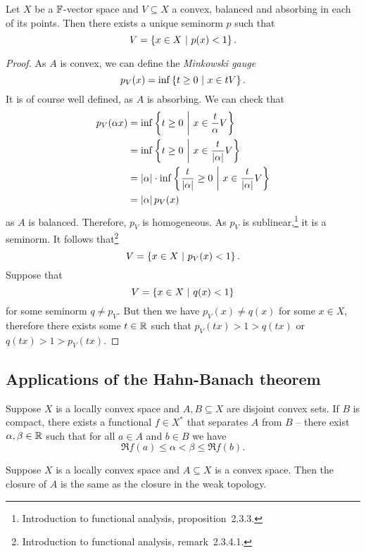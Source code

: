 \begin{izrek}
Let $X$ be a $\mathbb{F}$-vector space and $V \subseteq X$ a convex,
balanced and absorbing in each of its points. Then there exists a
unique seminorm $p$ such that
\[
V = \left\{x \in X~\middle\vert~p(x) < 1\right\}.
\]
\end{izrek}

\begin{proof}
As $A$ is convex, we can define the
\emph{Minkowski gauge}
\[
p_V(x) = \inf \left\{t \geq 0~\middle\vert~x \in tV\right\}.
\]
It is of course well defined, as $A$ is absorbing. We can check
that
\begin{align*}
p_V(\alpha x) &=
\inf \left\{t \geq 0~\middle\vert~x \in \frac{t}{\alpha} V\right\}
\\
&=
\inf \left\{t \geq 0~\middle\vert~x \in \frac{t}{\left\lvert \alpha\right\rvert} V\right\}
\\
&=
\left\lvert \alpha\right\rvert \cdot \inf
\left\{\frac{t}{\left\lvert \alpha\right\rvert} \geq 0~\middle\vert~x \in \frac{t}{\left\lvert \alpha\right\rvert} V\right\}
\\
&=
\left\lvert \alpha\right\rvert p_V(x)
\end{align*}
as $A$ is balanced. Therefore, $p_V$ is homogeneous. As $p_V$ is
sublinear,\footnote{Introduction to functional analysis,
proposition~2.3.3.} it is a seminorm. It follows
that\footnote{Introduction to functional analysis, remark~2.3.4.1.}
\[
V = \left\{x \in X~\middle\vert~p_V(x) < 1\right\}.
\]
Suppose that
\[
V = \left\{x \in X~\middle\vert~q(x) < 1\right\}
\]
for some seminorm $q \ne p_V$. But then we have $p_V(x) \ne q(x)$
for some $x \in X$, therefore there exists some $t \in \mathbb{R}$ such
that $p_V(tx) > 1 > q(tx)$ or $q(tx) > 1 > p_V(tx)$.
\end{proof}

\newpage

\subsection{Applications of the Hahn-Banach theorem}

\begin{izrek}
Suppose $X$ is a locally convex space and $A, B \subseteq X$ are
disjoint convex sets. If $B$ is compact, there exists a functional
$f \in X^*$ that separates $A$ from $B$ -- there exist
$\alpha, \beta \in \mathbb{R}$ such that for all $a \in A$ and $b \in B$ we
have
\[
\Re f(a) \leq \alpha < \beta \leq \Re f(b).
\]
\end{izrek}

\begin{izrek}
Suppose $X$ is a locally convex space and $A \subseteq X$ is a
convex space. Then the closure of $A$ is the same as the closure
in the weak topology.
\end{izrek}

